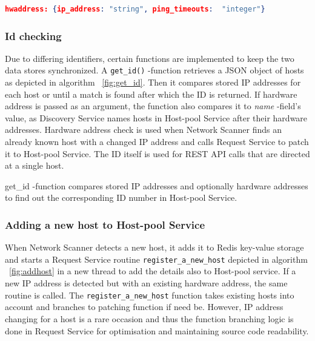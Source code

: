 \begin{lstlisting}[language=json,firstnumber=1, caption={Discovery Service data format for a single host}, captionpos=b, label=lst:discoformat]
hwaddress: {ip_address: "string", ping_timeouts:  "integer"}
\end{lstlisting}

\subsubsection{Id checking}

Due to differing identifiers, certain functions are implemented to keep the two data stores synchronized. A \verb|get_id()| -function retrieves a JSON object of hosts as depicted in algorithm ~\ref{fig:get_id}. Then it compares stored IP addresses for each host or until a match is found after which the ID is returned. If hardware address is passed as an argument, the function also compares it to \emph{name} -field's value, as Discovery Service names hosts in Host-pool Service after their hardware addresses. Hardware address check is used when Network Scanner finds an already known host with a changed IP address and calls Request Service to patch it to Host-pool Service. The ID itself is used for REST API calls that are directed at a single host.

\begin{center}
\begin{algorithm}[H]
\label{fig:get_id}
\begin{center}
\end{center}
\;
\caption{get\_id -function compares stored IP addresses and optionally hardware addresses to find out the corresponding ID number in Host-pool Service.}
\end{algorithm}
\end{center}

\subsubsection{Adding a new host to Host-pool Service} \label{addtohostpool}

When Network Scanner detects a new host, it adds it to Redis key-value storage and starts a Request Service routine \verb|register_a_new_host| depicted in algorithm ~\ref{fig:addhost} in
a new thread to add the details also to Host-pool service. If a new IP address is detected but with an existing hardware address, the same routine is called. The \verb|register_a_new_host| function takes existing hosts into account and branches to patching function if need be. However, IP address changing for a host is a rare occasion and thus the function branching logic is done in Request Service for optimisation and maintaining source code readability.

